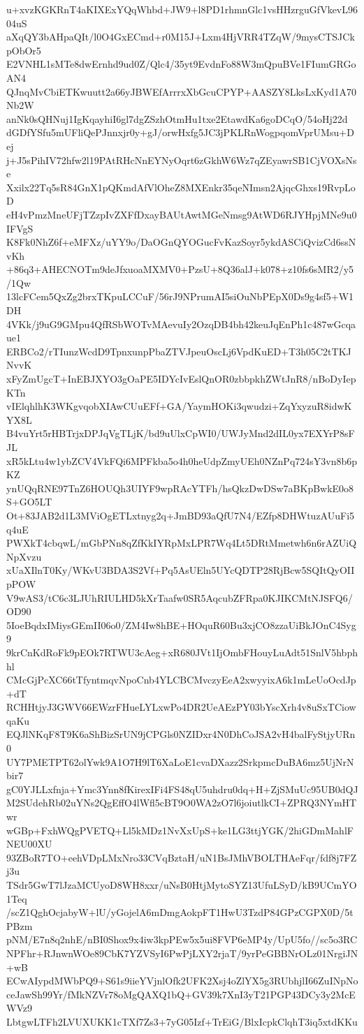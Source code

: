 u+xvzKGKRnT4aKIXExYQqWhbd+JW9+l8PD1rhmnGlc1vsHHzrguGfVkevL9604uS
aXqQY3bAHpaQIt/l0O4GxECmd+r0M15J+Lxm4HjVRR4TZqW/9mysCTSJCkpObOr5
E2VNHL1sMTe8dwErnhd9ud0Z/Qlc4/35yt9EvdnFo88W3mQpuBVe1FIumGRGoAN4
QJnqMvCbiETKwuutt2a66yJBWEfArrrxXbGcuCPYP+AASZY8LksLxKyd1A70Nb2W
anNk0sQHNuj1IgKqayhiI6gl7dgZSzhOtmHu1txe2EtawdKa6goDCqO/54oHj22d
dGDfYSfu5mUFliQePJnnxjr0y+gJ/orwHxfg5JC3jPKLRnWogpqomVprUMsu+Dej
j+J5sPihIV72hfw2l19PAtRHcNnEYNyOqrt6zGkhW6Wz7qZEyawrSB1CjVOXsNse
Xxilx22Tq5sR84GnX1pQKmdAfVlOheZ8MXEnkr35qeNImsn2AjqcGhxs19RvpLoD
eH4vPmzMneUFjTZzpIvZXFfDxayBAUtAwtMGeNmsg9AtWD6RJYHpjMNe9u0IFVgS
K8Fk0NhZ6f+eMFXz/uYY9o/DaOGnQYOGucFvKazSoyr5ykdASCiQvizCd6ssNvKh
+86q3+AHECNOTm9deJfxuoaMXMV0+PzsU+8Q36alJ+k078+z10fs6sMR2/y5/1Qw
13lcFCem5QxZg2brxTKpuLCCuF/56rJ9NPrumAI5siOuNbPEpX0Ds9g4sf5+W1DH
4VKk/j9uG9GMpu4QfRSbWOTvMAevuIy2OzqDB4bh42keuJqEnPh1c487wGcqaue1
ERBCo2/rTIunzWcdD9TpnxunpPbaZTVJpeuOscLj6VpdKuED+T3h05C2tTKJNvvK
xFyZmUgcT+InEBJXYO3gOaPE5IDYcIvEslQnOR0zbbpkhZWtJnR8/nBoDyIepKTn
vIElqhlhK3WKgvqobXIAwCUuEFf+GA/YaymHOKi3qwudzi+ZqYxyzuR8idwKYX8L
B4vuYrt5rHBTrjxDPJqVgTLjK/bd9uUlxCpWI0/UWJyMnd2dIL0yx7EXYrP8sFJL
xR5kLtu4w1ybZCV4VkFQi6MPFkba5o4h0heUdpZmyUEh0NZnPq724sY3vn8b6pKZ
ynUQqRNE97TnZ6HOUQh3UIYF9wpRAcYTFh/hsQkzDwDSw7aBKpBwkE0o8S+GO5LT
Ot+83JAB2d1L3MViOgETLxtnyg2q+JmBD93aQfU7N4/EZfp8DHWtuzAUuFi5q4uE
PWXkT4cbqwL/mGbPNn8qZfKkIYRpMxLPR7Wq4Lt5DRtMmetwh6n6rAZUiQNpXvzu
xUaXIlnT0Ky/WKvU3BDA3S2Vf+Pq5AsUEln5UYcQDTP28RjBcw5SQItQyOIIpPOW
V9wAS3/tC6c3LJUhRIULHD5kXrTaafw0SR5AqcubZFRpa0KJIKCMtNJSFQ6/OD90
5IoeBqdxIMiysGEmII06o0/ZM4Iw8hBE+HOquR60Bu3xjCO8zzaUiBkJOnC4Syg9
9krCnKdRoFk9pEOk7RTWU3cAeg+xR680JVt1IjOmbFHouyLuAdt51SnlV5hbphhl
CMcGjPcXC66tTfyntmqvNpoCnb4YLCBCMvczyEeA2xwyyixA6k1mLeUoOcdJp+dT
RCHHtjyJ3GWV66EWzrFHueLYLxwPo4DR2UeAEzPY03bYscXrh4v8uSxTCiowqaKu
EQJlNKqF8T9K6aShBizSrUN9jCPGls0NZIDxr4N0DhCoJSA2vH4balFyStjyURn0
UY7PMETPT62olYwk9A1O7H9lT6XaLoE1cvaDXazz2SrkpmcDuBA6mz5UjNrNbir7
gC0YJLLxfnja+Ymc3Ynn8fKirexIFi4FS48qU5uhdru0dq+H+ZjSMuUc95UB0dQJ
M2SUdehRb02uYNs2QgEffO4lWfl5cBT9O0WA2zO7l6joiutlkCI+ZPRQ3NYmHTwr
wGBp+FxhWQgPVETQ+Ll5kMDz1NvXxUpS+ke1LG3ttjYGK/2hiGDmMahlFNEU00XU
93ZBoR7TO+eehVDpLMxNro33CVqBztaH/uN1BsJMhVBOLTHAeFqr/fdf8j7FZj3u
TSdr5GwT7lJzaMCUyoD8WH8xxr/uNsB0HtjMytoSYZ13UfuLSyD/kB9UCmYO1Teq
/scZ1QghOcjabyW+lU/yGojelA6mDmgAokpFT1HwU3TzdP84GPzCGPX0D/5tPBzm
pNM/E7n8q2nhE/nBI0Shox9x4iw3kpPEw5x5ui8FVP6eMP4y/UpU5fo//sc5o3RC
NPFhr+RJnwnWOe89CbK7YZVSyI6PwPjLXY2rjaT/9yrPeGBBNrOLz01NrgiJN+wB
ECwAIypdMWbPQ9+S61s9iieYVjnlOfk2UFK2Xsj4oZlYX5g3RUbhjlI66ZuINpNo
ceJawSh99Yr/fMkNZVr78oMgQAXQ1bQ+GV39k7XnI3yT21PGP43DCy3y2McEWVz9
LbtgwLTFh2LVUXUKK1cTXf7Zs3+7yG05Izf+TrEiG/BlxIcpkClqhT3iq5xtdKKu
